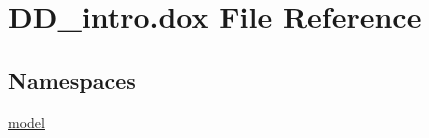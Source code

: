 \hypertarget{_d_d__intro_8dox}{}\section{D\+D\+\_\+intro.\+dox File Reference}
\label{_d_d__intro_8dox}
\subsection*{Namespaces}
\begin{DoxyCompactItemize}
\item 
 \hyperlink{namespacemodel}{model}
\end{DoxyCompactItemize}
